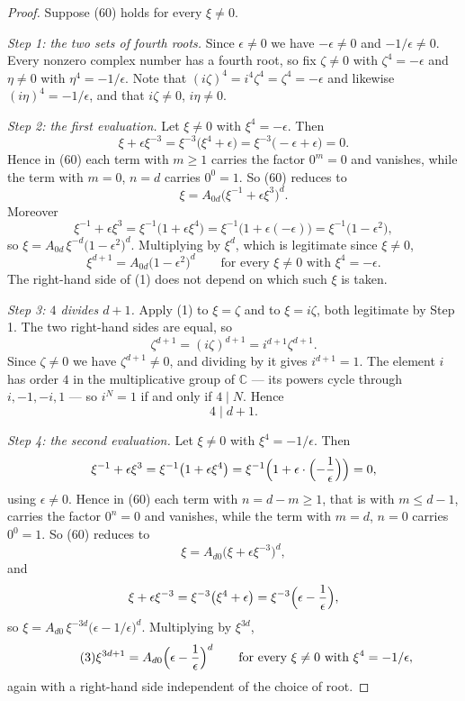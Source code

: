 \begin{proof}
Suppose (60) holds for every $\xi\neq0$.

\emph{Step 1: the two sets of fourth roots.}  Since $\epsilon\neq0$ we have
$-\epsilon\neq0$ and $-1/\epsilon\neq0$.  Every nonzero complex number has a
fourth root, so fix $\zeta\neq0$ with $\zeta^{4}=-\epsilon$ and $\eta\neq0$ with
$\eta^{4}=-1/\epsilon$.  Note that $(i\zeta)^{4}=i^{4}\zeta^{4}=\zeta^{4}=-\epsilon$
and likewise $(i\eta)^{4}=-1/\epsilon$, and that $i\zeta\neq0$, $i\eta\neq0$.

\emph{Step 2: the first evaluation.}  Let $\xi\neq0$ with $\xi^{4}=-\epsilon$.
Then
\[
  \xi+\epsilon\xi^{-3}=\xi^{-3}\bigl(\xi^{4}+\epsilon\bigr)
  =\xi^{-3}\bigl(-\epsilon+\epsilon\bigr)=0 .
\]
Hence in (60) each term with $m\ge1$ carries the factor $0^{m}=0$ and vanishes,
while the term with $m=0$, $n=d$ carries $0^{0}=1$.  So (60) reduces to
\[
  \xi=A_{0d}\bigl(\xi^{-1}+\epsilon\xi^{3}\bigr)^{d} .
\]
Moreover
\[
  \xi^{-1}+\epsilon\xi^{3}=\xi^{-1}\bigl(1+\epsilon\xi^{4}\bigr)
  =\xi^{-1}\bigl(1+\epsilon(-\epsilon)\bigr)=\xi^{-1}\bigl(1-\epsilon^{2}\bigr),
\]
so $\xi=A_{0d}\,\xi^{-d}\bigl(1-\epsilon^{2}\bigr)^{d}$.  Multiplying by
$\xi^{d}$, which is legitimate since $\xi\neq0$,
\begin{equation}\tag{1}
  \xi^{d+1}=A_{0d}\bigl(1-\epsilon^{2}\bigr)^{d}
  \qquad\text{for every }\xi\neq0\text{ with }\xi^{4}=-\epsilon .
\end{equation}
The right-hand side of (1) does not depend on which such $\xi$ is taken.

\emph{Step 3: $4$ divides $d+1$.}  Apply (1) to $\xi=\zeta$ and to
$\xi=i\zeta$, both legitimate by Step 1.  The two right-hand sides are equal,
so
\[
  \zeta^{d+1}=(i\zeta)^{d+1}=i^{d+1}\zeta^{d+1}.
\]
Since $\zeta\neq0$ we have $\zeta^{d+1}\neq0$, and dividing by it gives
$i^{d+1}=1$.  The element $i$ has order $4$ in the multiplicative group of
$\mathbb{C}$ --- its powers cycle through $i,-1,-i,1$ --- so $i^{N}=1$ if and
only if $4\mid N$.  Hence
\begin{equation}\tag{2}
  4\mid d+1 .
\end{equation}

\emph{Step 4: the second evaluation.}  Let $\xi\neq0$ with
$\xi^{4}=-1/\epsilon$.  Then
\[
  \xi^{-1}+\epsilon\xi^{3}=\xi^{-1}\bigl(1+\epsilon\xi^{4}\bigr)
  =\xi^{-1}\Bigl(1+\epsilon\cdot\Bigl(-\frac1\epsilon\Bigr)\Bigr)=0 ,
\]
using $\epsilon\neq0$.  Hence in (60) each term with $n=d-m\ge1$, that is with
$m\le d-1$, carries the factor $0^{n}=0$ and vanishes, while the term with
$m=d$, $n=0$ carries $0^{0}=1$.  So (60) reduces to
\[
  \xi=A_{d0}\bigl(\xi+\epsilon\xi^{-3}\bigr)^{d},
\]
and
\[
  \xi+\epsilon\xi^{-3}=\xi^{-3}\bigl(\xi^{4}+\epsilon\bigr)
  =\xi^{-3}\Bigl(\epsilon-\frac1\epsilon\Bigr),
\]
so $\xi=A_{d0}\,\xi^{-3d}\bigl(\epsilon-1/\epsilon\bigr)^{d}$.  Multiplying by
$\xi^{3d}$,
\begin{equation}\tag{3}
  \xi^{3d+1}=A_{d0}\Bigl(\epsilon-\frac1\epsilon\Bigr)^{d}
  \qquad\text{for every }\xi\neq0\text{ with }\xi^{4}=-1/\epsilon ,
\end{equation}
again with a right-hand side independent of the choice of root.


\end{proof}
